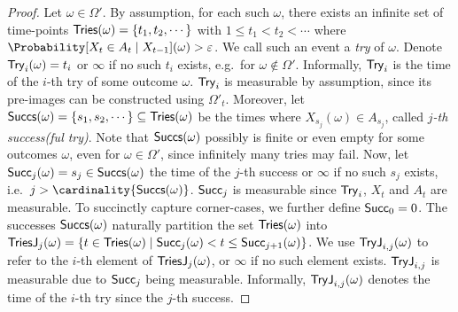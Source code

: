\documentclass{theoretics}
\begin{document}
\begin{proof}

	Let $\omega \in \Omega'$.
	By assumption, for each such $\omega$, there exists an infinite set of time-points $\tries(\omega) = \{t_1, t_2, \cdots\}$ with $1 \leq t_1 < t_2 < \cdots$ where $\Probability[X_t \in A_t \mid X_{t-1}](\omega) > \varepsilon$.
	We call such an event a \emph{try} of $\omega$.
	Denote $\ithtry<i>(\omega) = t_i$ or $\infty$ if no such $t_i$ exists, e.g.\ for $\omega \notin \Omega'$.
	Informally, $\ithtry<i>$ is the time of the $i$-th try of some outcome $\omega$.
	$\ithtry<i>$ is measurable by assumption, since its pre-images can be constructed using $\Omega'_t$.
	Moreover, let $\successes(\omega) = \{s_1, s_2, \cdots\} \subseteq \tries(\omega)$ be the times where $X_{s_j}(\omega) \in A_{s_j}$, called \emph{$j$-th success(ful try)}.
	Note that $\successes(\omega)$ possibly is finite or even empty for some outcomes $\omega$, even for $\omega \in \Omega'$, since infinitely many tries may fail.
	Now, let $\jthsuccess<j>(\omega) = s_j \in \successes(\omega)$ the time of the $j$-th success or $\infty$ if no such $s_j$ exists, i.e.\ $j > \cardinality{\successes(\omega)}$.
	$\jthsuccess<j>$ is measurable since $\ithtry<i>$, $X_t$ and $A_t$ are measurable.
	To succinctly capture corner-cases, we further define $\jthsuccess<0> = 0$.
	The successes $\successes(\omega)$ naturally partition the set $\tries(\omega)$ into $\triesafter<j>(\omega) = \{t \in \tries(\omega) \mid \jthsuccess<j>(\omega) < t \leq \jthsuccess<j+1>(\omega)\}$.
	We use $\ithtryafter<i><j>(\omega)$ to refer to the $i$-th element of $\triesafter<j>(\omega)$, or $\infty$ if no such element exists.
	$\ithtryafter<i><j>$ is measurable due to $\jthsuccess<j>$ being measurable.
	Informally, $\ithtryafter<i><j>(\omega)$ denotes the time of the $i$-th try since the $j$-th success.


\end{proof}
\end{document}
